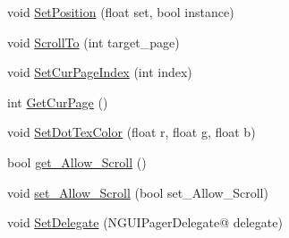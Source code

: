 \begin{DoxyCompactItemize}
\item 
void \hyperlink{class_n_g_u_i_pager_a0b98e88e14d79df999474315c1eaf425}{Set\+Position} (float set, bool instance)
\item 
void \hyperlink{class_n_g_u_i_pager_aacc4ab035a55752564bd3d38087ba3a6}{Scroll\+To} (int target\+\_\+page)
\item 
void \hyperlink{class_n_g_u_i_pager_a5d4ceca5659fa24c302d2eb7a5410450}{Set\+Cur\+Page\+Index} (int index)
\item 
int \hyperlink{class_n_g_u_i_pager_aef691c43a887fc973407e1c009bf4baa}{Get\+Cur\+Page} ()
\item 
void \hyperlink{class_n_g_u_i_pager_a2a538e43e2509b0e2dc18f009eaffa52}{Set\+Dot\+Tex\+Color} (float r, float g, float b)
\item 
bool \hyperlink{class_n_g_u_i_pager_a674d792971d56a9be0df41066191aab8}{get\+\_\+\+Allow\+\_\+\+Scroll} ()
\item 
void \hyperlink{class_n_g_u_i_pager_a781d9c02a767b9b0ae026c1a02848c73}{set\+\_\+\+Allow\+\_\+\+Scroll} (bool set\+\_\+\+Allow\+\_\+\+Scroll)
\item 
void \hyperlink{class_n_g_u_i_pager_a1ea6baf13b2e56d802cb928f23f2da00}{Set\+Delegate} (N\+G\+U\+I\+Pager\+Delegate@ delegate)
\end{DoxyCompactItemize}
